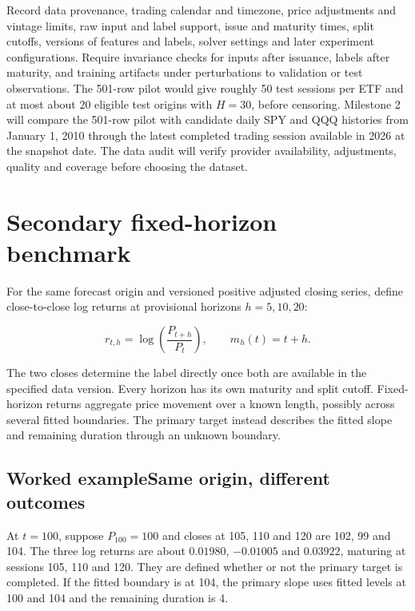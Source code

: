 \documentclass[10pt,letterpaper]{article}
\begin{document}
Record data provenance, trading calendar and timezone, price adjustments and vintage limits, raw input and label support, issue and maturity times, split cutoffs, versions of features and labels, solver settings and later experiment configurations. Require invariance checks for inputs after issuance, labels after maturity, and training artifacts under perturbations to validation or test observations. The 501-row pilot would give roughly 50 test sessions per ETF and at most about 20 eligible test origins with \(H=30\), before censoring. Milestone 2 will compare the 501-row pilot with candidate daily SPY and QQQ histories from January 1, 2010 through the latest completed trading session available in 2026 at the snapshot date. The data audit will verify provider availability, adjustments, quality and coverage before choosing the dataset.\par

\clearpage

\section{Secondary fixed-horizon benchmark}

For the same forecast origin and versioned positive adjusted closing series, define close-to-close log returns at provisional horizons \(h=5,10,20\):\par

\[
r_{t,h}=\log\!\left(\frac{P_{t+h}}{P_t}\right),\qquad m_h(t)=t+h.
\]

The two closes determine the label directly once both are available in the specified data version. Every horizon has its own maturity and split cutoff. Fixed-horizon returns aggregate price movement over a known length, possibly across several fitted boundaries. The primary target instead describes the fitted slope and remaining duration through an unknown boundary.\par

\subsection*{Worked example\quad Same origin, different outcomes}

At \(t=100\), suppose \(P_{100}=100\) and closes at 105, 110 and 120 are 102, 99 and 104. The three log returns are about \(0.01980\), \(-0.01005\) and \(0.03922\), maturing at sessions 105, 110 and 120. They are defined whether or not the primary target is completed. If the fitted boundary is at 104, the primary slope uses fitted levels at 100 and 104 and the remaining duration is 4.\par
\end{document}
